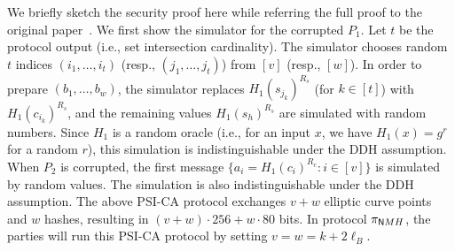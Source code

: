 We briefly sketch the security proof here while referring the full proof to the original paper~\cite{DGT12}. We first show the simulator for the corrupted $P_1$. Let $t$ be the protocol output (i.e., set intersection cardinality). The simulator chooses random $t$ indices $(i_1, \ldots, i_t)$ (resp., $(j_1, \ldots, j_t)$) from $[v]$  (resp., $[w]$).  In order to prepare $(b_1, \ldots, b_w)$, the simulator replaces $H_1(s_{j_k})^{R_s}$ (for $k \in [t]$) with $H_1(c_{i_k})^{R_s}$, and the remaining values $H_1(s_h)^{R_s}$ are simulated with random numbers. Since $H_1$ is a random oracle (i.e., for an input $x$, we have $H_1(x) = g^r$ for a random $r$), this simulation is indistinguishable under the DDH assumption. When $P_2$ is corrupted, the first message $\{a_i = H_1(c_i)^{R_c} : i \in [v]\}$ is simulated by random values. The simulation is also  indistinguishable under the DDH assumption.
The above PSI-CA protocol
exchanges $v + w$ elliptic curve points and $w$ hashes, resulting in $(v +
w)\cdot 256 + w\cdot 80$ bits. In protocol $\pi_{\mathsf NMH}$, the parties will run
this PSI-CA protocol by setting $v = w = k + 2\ell_B$. 


